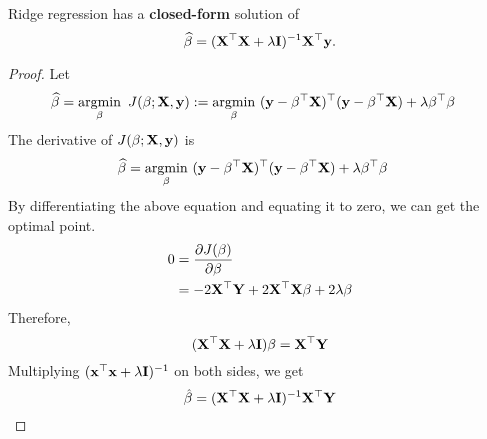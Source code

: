 \begin{property}
Ridge regression has a \textbf{closed-form} solution of
\begin{equation}
\widehat{\beta} = (\mathbf{X} ^\top \mathbf{X} + \lambda \mathbf{I} )^{-1} \mathbf{X}^\top \mathbf{y}.
\end{equation}
\end{property}
\begin{proof} Let
\begin{align}
	\widehat{\beta} & = \operatorname*{argmin}_\beta\ J(\beta; \mathbf{X}, \mathbf{y}) :=  \operatorname*{argmin}_\beta\ (\mathbf{y}-\beta^\top \mathbf{X})^\top(\mathbf{y}-\beta^\top \mathbf{X})+\lambda \beta^\top \beta
\end{align}
The derivative of $J(\beta; \mathbf{X}, \mathbf{y})$ is 
\begin{align}
	\widehat{\beta} & = \operatorname*{argmin}_\beta\ (\mathbf{y}-\beta^\top \mathbf{X})^\top(\mathbf{y}-\beta^\top \mathbf{X})+\lambda \beta^\top \beta
\end{align}
By differentiating the above equation and equating it to zero, we can get the optimal point.
\begin{equation}
\begin{aligned}
	0 & = \frac{\partial J(\beta)}{\partial \beta} \\
	& = -2 \mathbf{X}^\top \mathbf{Y} + 2 \mathbf{X}^\top \mathbf{X} \beta + 2 \lambda \beta \\
\end{aligned}
\end{equation} 
Therefore,
\begin{equation}
	(\mathbf{X}^\top \mathbf{X} + \lambda \mathbf{I}) \beta = \mathbf{X}^\top \mathbf{Y}
\end{equation}
Multiplying $(\mathbf{x}^\top \mathbf{x} + \lambda \mathbf{I})^{-1}$ on both sides, we get
\begin{equation}
	\hat{\beta} = (\mathbf{X}^\top \mathbf{X} + \lambda \mathbf{I})^{-1} \mathbf{X}^\top \mathbf{Y}
\end{equation}
\end{proof}

